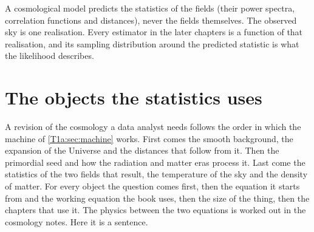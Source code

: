 \begin{keyidea}
A cosmological model predicts the statistics of the fields (their power spectra, correlation functions and distances), never the fields themselves. The observed sky is one realisation. Every estimator in the later chapters is a function of that realisation, and its sampling distribution around the predicted statistic is what the likelihood describes.
\end{keyidea}

\section{The objects the statistics uses}
\label{T1a:sec:objects}

A revision of the cosmology a data analyst needs follows the order in which the machine of \cref{T1a:sec:machine} works. First comes the smooth background, the expansion of the Universe and the distances that follow from it. Then the primordial seed and how the radiation and matter eras process it. Last come the statistics of the two fields that result, the temperature of the sky and the density of matter. For every object the question comes first, then the equation it starts from and the working equation the book uses, then the size of the thing, then the chapters that use it. The physics between the two equations is worked out in the cosmology notes. Here it is a sentence.

